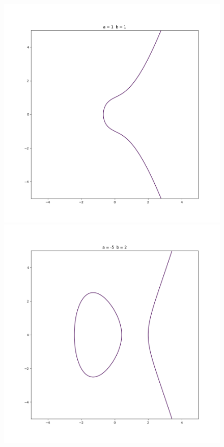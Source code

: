 \documentclass[12pt,a4paper]{report}
\begin{document}
\begin{figure}[h!]
\includegraphics[scale=0.32]{Figure_2}\\
\includegraphics[scale=0.32]{Figure_3}

\end{figure}
\end{document}
